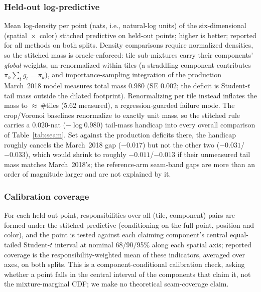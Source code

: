 \subsubsection{Held-out log-predictive}
Mean log-density per point (nats, i.e., natural-log units) of the
six-dimensional
(spatial~$\times$~color) stitched predictive on held-out points; higher
is better; reported for all methods on both splits. Density comparisons
require normalized densities, so the stitched mass is oracle-enforced:
tile sub-mixtures carry their components' \emph{global} weights,
un-renormalized within tiles (a straddling component contributes
$\pi_k \sum_t g_t = \pi_k$), and importance-sampling integration of the
production March~2018 model measures total mass $0.980$ (SE $0.002$;
the deficit is Student-$t$ tail mass outside the dilated footprint).
Renormalizing per tile instead inflates the mass to
${\approx}$\,\#tiles ($5.62$ measured), a regression-guarded failure
mode. The crop/Voronoi baselines renormalize to exactly unit mass, so
the stitched rule carries a $0.020$-nat ($-\log 0.980$) tail-mass
handicap into every overall comparison of Table~\ref{tab:seam}. Set
against the production deficits there, the handicap roughly cancels
the March~2018 gap ($-0.017$) but not the other two
($-0.031$/$-0.033$), which would shrink to roughly
$-0.011$/$-0.013$ if their unmeasured tail mass matches
March~2018's; the reference-arm seam-band gaps are more than an order
of magnitude larger and are not explained by it.

\subsubsection{Calibration coverage}
For each held-out point, responsibilities over all (tile, component)
pairs are formed under the stitched predictive (conditioning on the
full point, position and color), and the point is tested against each
claiming component's central equal-tailed Student-$t$ interval at
nominal 68/90/95\% along each spatial axis; reported coverage is the
responsibility-weighted mean of these indicators, averaged over axes,
on both splits. This is a component-conditional calibration check,
asking whether a point falls in the central interval of the components
that claim it, not the mixture-marginal CDF; we make no theoretical
seam-coverage claim.

